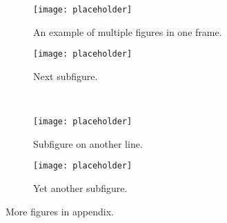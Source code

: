 \begin{figure}[ht]
    \centering
    \begin{subfigure}[t]{0.4\textwidth}
        \centering\texttt{[image: placeholder]}
        \caption{An example of multiple figures in one frame.}
        \label{fig:multiple:example11}
    \end{subfigure}
    \begin{subfigure}[t]{0.4\textwidth}
        \centering\texttt{[image: placeholder]}
        \caption{Next subfigure.}
        \label{fig:multiple:example12}
    \end{subfigure}
    \\
    \begin{subfigure}[t]{0.4\textwidth}
        \centering\texttt{[image: placeholder]}
        \caption{Subfigure on another line.}
        \label{fig:multiple:example21}
    \end{subfigure}
    \begin{subfigure}[t]{0.4\textwidth}
        \centering\texttt{[image: placeholder]}
        \caption{Yet another subfigure.}
        \label{fig:multiple:example22}
    \end{subfigure}
    \caption{More figures in appendix.}
    \label{fig:multiple}
\end{figure}